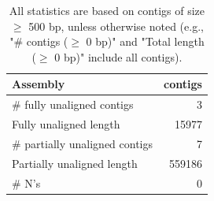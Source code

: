 \documentclass[12pt,a4paper]{article}
\begin{document}
\begin{table}[ht]
\begin{center}
\caption{All statistics are based on contigs of size $\geq$ 500 bp, unless otherwise noted (e.g., "\# contigs ($\geq$ 0 bp)" and "Total length ($\geq$ 0 bp)" include all contigs).}
\begin{tabular}{|l*{1}{|r}|}
\hline
Assembly & contigs \\ \hline
\# fully unaligned contigs & 3 \\ \hline
Fully unaligned length & 15977 \\ \hline
\# partially unaligned contigs & 7 \\ \hline
Partially unaligned length & 559186 \\ \hline
\# N's & 0 \\ \hline
\end{tabular}
\end{center}
\end{table}
\end{document}
